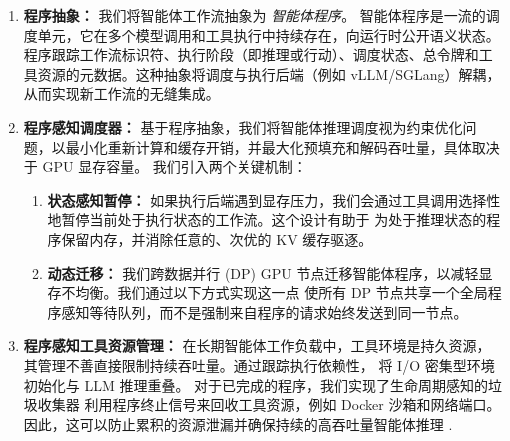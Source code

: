 \begin{enumerate}[itemsep=0.0pt,topsep=0pt,leftmargin=*]

    \item \textbf{程序抽象：} 我们将智能体工作流抽象为 \textit{智能体程序}。
    智能体程序是一流的调度单元，它在多个模型调用和工具执行中持续存在，向运行时公开语义状态。
    程序跟踪工作流标识符、执行阶段（即推理或行动）、调度状态、总令牌和工具资源的元数据。这种抽象将调度与执行后端（例如 vLLM/SGLang）解耦，从而实现新工作流的无缝集成。

    \item \textbf{程序感知调度器：} 基于程序抽象，我们将智能体推理调度视为约束优化问题，以最小化重新计算和缓存开销，并最大化预填充和解码吞吐量，具体取决于 GPU 显存容量。
    我们引入两个关键机制：
    \begin{enumerate}[itemsep=0.0pt,topsep=0pt,leftmargin=*]
        \item \textbf{状态感知暂停：} 如果执行后端遇到显存压力，我们会通过工具调用选择性地暂停当前处于执行状态的工作流。这个设计有助于
        为处于推理状态的程序保留内存，并消除任意的、次优的 KV 缓存驱逐。
        \item \textbf{动态迁移：} 我们跨数据并行 (DP) GPU 节点迁移智能体程序，以减轻显存不均衡。我们通过以下方式实现这一点
        使所有 DP 节点共享一个全局程序感知等待队列，而不是强制来自程序的请求始终发送到同一节点。
    \end{enumerate}

    \item \textbf{程序感知工具资源管理：} 在长期智能体工作负载中，工具环境是持久资源，其管理不善直接限制持续吞吐量。通过跟踪执行依赖性， \ouralg 将 I/O 密集型环境初始化与 LLM 推理重叠。
    对于已完成的程序，我们实现了生命周期感知的垃圾收集器
    利用程序终止信号来回收工具资源，例如 Docker 沙箱和网络端口。
    因此，这可以防止累积的资源泄漏并确保持续的高吞吐量智能体推理 \ouralg.

\end{enumerate}

